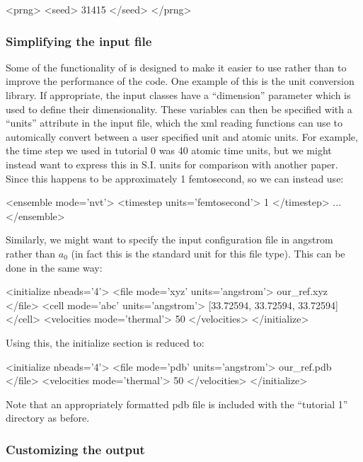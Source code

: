 \documentclass[11pt,english,fleqn]{report}
\newenvironment{code}{%
\footnotesize 
\verbatim
}{
\endverbatim
\normalsize
}
\begin{document}
\begin{code}
<prng> <seed> 31415 </seed> </prng>
\end{code}

\subsubsection{Simplifying the input file}

Some of the functionality of \ipi is designed to make it easier to use rather
than to improve the performance of the code. One example of this is the
unit conversion library. If appropriate, the input classes have a {}``dimension''
parameter which is used to define their dimensionality.
These variables can then be specified with a {}``units'' attribute
in the input file, which
the xml reading functions can use to automically convert between a 
user specified unit and atomic units. 
For example, the time step we used in tutorial 0
was 40 atomic time units, but we might instead want to express this in S.I.
units for comparison with another paper. Since this happens to be approximately
1 femtosecond, so we can instead use:

\begin{code}
<ensemble mode='nvt'>
   <timestep units='femtosecond'> 1 </timestep>
   ...
</ensemble>
\end{code}
 
Similarly, we might want to specify the input configuration file in
angstrom rather than \(a_0\) (in fact this is the standard unit for
this file type). This can be done in the same way:

\begin{code}
<initialize nbeads='4'>
   <file mode='xyz' units='angstrom'> our_ref.xyz </file>
   <cell mode='abc' units='angstrom'>
      [33.72594, 33.72594, 33.72594]
   </cell>
   <velocities mode='thermal'> 50 </velocities>
</initialize>
\end{code}

Using this, the initialize section is reduced to:

\begin{code}
<initialize nbeads='4'>
   <file mode='pdb' units='angstrom'> our_ref.pdb </file>
   <velocities mode='thermal'> 50 </velocities>
</initialize>
\end{code}

Note that an appropriately formatted pdb file is included with the
{}``tutorial 1'' directory as before.

\subsubsection{Customizing the output}
\end{document}
